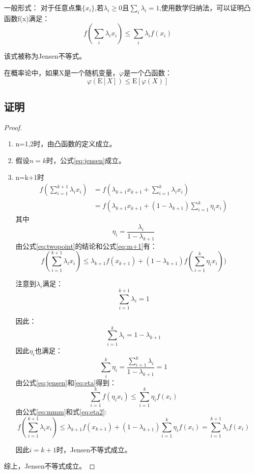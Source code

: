 \documentclass[a4paper]{article} %
\numberwithin{equation}{section} %
\begin{document}
一般形式：
对于任意点集$\{x_i\}$,若$\lambda_i\ge 0$且$\sum_i\lambda_i=1$,使用数学归纳法，可以证明凸函数f(x)满足：
\begin{equation}
f(\sum_i\lambda_ix_i)\le \sum_i\lambda_i f(x_i) \label{eq:jensen}
\end{equation}

该式被称为Jensen不等式。

在概率论中，如果X是一个随机变量，$\varphi$是一个凸函数：
\begin{equation}
\varphi(\mathrm{E}[X])\le \mathrm{E}[\varphi(X)]
\end{equation}

\subsection{证明}

\begin{proof}
\begin{enumerate}
\item n=1,2时，由凸函数的定义成立。
\item 假设$n=k$时，公式\eqref{eq:jensen}成立。
\item n=k+1时
\begin{align}
f(\sum_{i=1}^{k+1}\lambda_i x_i) 
&=f(\lambda_{k+1}x_{k+1}+\sum_{i=1}^k\lambda_i x_i) \\
&=f(\lambda_{k+1}x_{k+1}+(1-\lambda_{k+1})\sum_{i=1}^k\eta_i x_i) \label{eq:m+1}
\end{align}
其中
\begin{equation}
\eta_i=\frac{\lambda_i}{1-\lambda_{k+1}} 
\end{equation}
由公式\eqref{eq:twopoint}的结论和公式\eqref{eq:m+1}有：
\begin{equation}
f(\sum_{i=1}^{k+1}\lambda_i x_i)\le \lambda_{k+1}f(x_{k+1})+(1-\lambda_{k+1})f(\sum_{i=1}^k\eta_i x_i)) \label{eq:mmm}
\end{equation}

注意到$\lambda_i$满足：
\begin{equation}
\sum_{i=1}^{k+1}\lambda_i=1
\end{equation}

因此：
\begin{equation}
\sum_{i=1}^k\lambda_i=1-\lambda_{k+1}
\end{equation}
因此$\eta_i$也满足：
\begin{equation}
\sum_{i}^k\eta_i=\frac{\sum_{i=1}^k\lambda_i}{1-\lambda_{k+1}}=1 \label{eq:eta}
\end{equation}
由公式\eqref{eq:jensen}和\eqref{eq:eta}得到：
\begin{equation}
\sum_{i=1}^kf(\eta_ix_i) \le \sum_{i=1}^{k}\eta_if(x_i) \label{eq:eta2}
\end{equation}
由公式\eqref{eq:mmm}和式\eqref{eq:eta2}:
\begin{equation}
f(\sum_{i=1}^{k+1}\lambda_ix_i)\le \lambda_{k+1}f(x_{k+1})+(1-\lambda_{k+1})\sum_{i=1}^k\eta_if(x_i)=\sum_{i=1}^{k+1}\lambda_if(x_i)
\end{equation}

因此$i=k+1$时，Jensen不等式成立。
\end{enumerate}
综上，Jensen不等式成立。
\end{proof}
\end{document}
